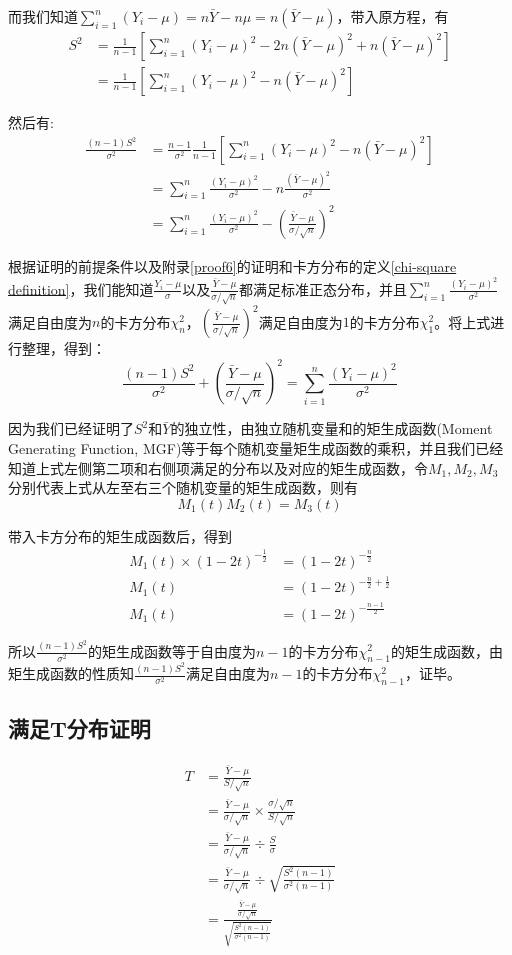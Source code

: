 \documentclass[UTF8]{ctexbook}
\begin{document}
而我们知道$\sum_{i=1}^n(Y_i-\mu)=n\bar Y-n\mu=n(\bar Y-\mu)$，带入原方程，有
\begin{align*}
	S^2&=\frac{1}{n-1}\left[\sum_{i=1}^n(Y_i-\mu)^2-2n(\bar Y-\mu)^2+n(\bar Y-\mu)^2\right]\\
	&=\frac{1}{n-1}\left[\sum_{i=1}^n(Y_i-\mu)^2-n(\bar Y-\mu)^2\right]
\end{align*}

然后有:
\begin{align*}
	\frac{(n-1)S^2}{\sigma^2}&=\frac{n-1}{\sigma^2}\frac{1}{n-1}\left[\sum_{i=1}^n(Y_i-\mu)^2-n(\bar Y-\mu)^2\right]\\
	&=\sum_{i=1}^n\frac{(Y_i-\mu)^2}{\sigma^2}-n\frac{(\bar Y-\mu)^2}{\sigma^2}\\
	&=\sum_{i=1}^n\frac{(Y_i-\mu)^2}{\sigma^2}-\left(\frac{\bar Y-\mu}{\sigma/\sqrt n}\right)^2
\end{align*}

根据证明的前提条件以及附录\ref{proof6}的证明和卡方分布的定义\ref{chi-square definition}，我们能知道$\frac{Y_i-\mu}{\sigma}$以及$\frac{\bar Y-\mu}{\sigma/\sqrt n}$都满足标准正态分布，并且$\sum_{i=1}^n\frac{(Y_i-\mu)^2}{\sigma^2}$满足自由度为$n$的卡方分布$\chi^2_{n}$，$\left(\frac{\bar Y-\mu}{\sigma/\sqrt n}\right)^2$满足自由度为$1$的卡方分布$\chi^2_1$。将上式进行整理，得到：
\[
	\frac{(n-1)S^2}{\sigma^2}+\left(\frac{\bar Y-\mu}{\sigma/\sqrt n}\right)^2=\sum_{i=1}^n\frac{(Y_i-\mu)^2}{\sigma^2}
\]

因为我们已经证明了$S^2$和$\bar Y$的独立性，由独立随机变量和的矩生成函数(Moment Generating Function, MGF)等于每个随机变量矩生成函数的乘积，并且我们已经知道上式左侧第二项和右侧项满足的分布以及对应的矩生成函数，令$M_1,M_2,M_3$分别代表上式从左至右三个随机变量的矩生成函数，则有
\[
	M_1(t)M_2(t)=M_3(t)
\]

带入卡方分布的矩生成函数后，得到
\begin{align*}
	M_1(t)\times(1-2t)^{-\frac{1}{2}}&=(1-2t)^{-\frac{n}{2}}\\
	M_1(t)&=(1-2t)^{-\frac{n}{2}+\frac{1}{2}}\\
	M_1(t)&=(1-2t)^{-\frac{n-1}{2}}
\end{align*}

所以$\frac{(n-1)S^2}{\sigma^2}$的矩生成函数等于自由度为$n-1$的卡方分布$\chi_{n-1}^2$的矩生成函数，由矩生成函数的性质知$\frac{(n-1)S^2}{\sigma^2}$满足自由度为$n-1$的卡方分布$\chi_{n-1}^2$，证毕。

\subsection{满足T分布证明}
\label{proof12}
\begin{align*}
	T&=\frac{\bar Y-\mu}{S/\sqrt{n}}\\
	&=\frac{\bar Y-\mu}{\sigma/\sqrt{n}}\times\frac{\sigma/\sqrt{n}}{S/\sqrt{n}}\\
	&=\frac{\bar Y-\mu}{\sigma/\sqrt{n}}\div\frac{S}{\sigma}\\
	&=\frac{\bar Y-\mu}{\sigma/\sqrt{n}}\div\sqrt{\frac{S^2(n-1)}{\sigma^2(n-1)}}\\
	&=\frac{\frac{\bar Y-\mu}{\sigma/\sqrt{n}}}{\sqrt{\frac{S^2(n-1)}{\sigma^2(n-1)}}}
\end{align*}
\end{document}
